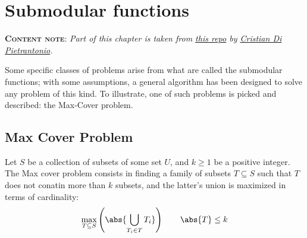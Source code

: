 \chapter{Submodular functions}

\textbf{\textsc{Content note}}: \emph{Part of this chapter is taken from \href{https://github.com/Halolegend94/uni_social_behavioral_networks/blob/master/chapters/ch03-submodular.tex}{this repo} by \href{https://github.com/Halolegend94}{Cristian Di Pietrantonio}.}
\vspace{2ex}

Some specific classes of problems arise from what are called the submodular functions; with some assumptions, a general algorithm has been designed to solve any problem of this kind. To illustrate, one of such problems is picked and described: the Max-Cover problem.

\section{Max Cover Problem}\label{sec:max-cover}

\begin{definition}\label{max-cover}
    Let $S$ be a collection of subsets of some set $U$, and $k \geq 1$ be a positive integer. The Max cover problem consists in finding a family of subsets $T \subseteq S$ such that $T$ does not conatin more than $k$ subsets, and the latter's union is maximized in terms of cardinality:
    \begin{equation}\label{eq:coverage}
        \max_{T \subseteq S} \left( \abs{\bigcup_{T_i \in T} T_i} \right) \qquad \abs{T} \leq k
    \end{equation}
\end{definition}

